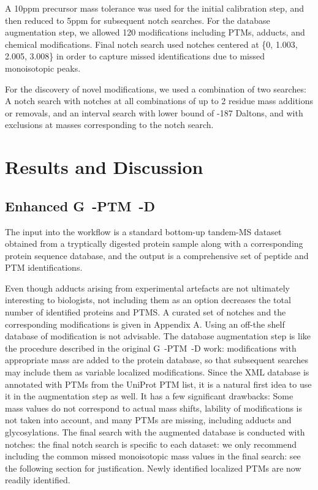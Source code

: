\documentclass[journal=jprobs,manuscript=article]{achemso}
\begin{document}
A 10ppm precursor mass tolerance was used for the initial calibration step, and then reduced to 5ppm for subsequent notch searches. For the database augmentation step, we allowed 120 modifications including PTMs, adducts, and chemical modifications. Final notch search used notches centered at \{0, 1.003, 2.005, 3.008\} in order to capture missed identifications due to missed monoisotopic peaks.

For the discovery of novel modifications, we used a combination of two searches: A notch search with notches at all combinations of up to 2 residue mass additions or removals, and an interval search with lower bound of -187 Daltons, and with exclusions at masses corresponding to the notch search.

\section{Results and Discussion}

\subsection{Enhanced G~-PTM~-D}

The input into the workflow is a standard bottom-up tandem-MS dataset obtained from a tryptically digested protein sample along with a corresponding protein sequence database, and the output is a comprehensive set of peptide and PTM identifications. 

Even though adducts arising from experimental artefacts are not ultimately interesting to biologists, not including them as an option decreases the total number of identified proteins and PTMS. A curated set of notches and the corresponding modifications is given in Appendix A. Using an off-the shelf database of modification is not advisable. The database augmentation step is like the procedure described in the original G~-PTM~-D work: modifications with appropriate mass are added to the protein database, so that subsequent searches may include them as variable localized modifications. 
Since the XML database is annotated with PTMs from the UniProt PTM list, it is a natural first idea to use it in the augmentation step as well. It has a few significant drawbacks: Some mass values do not correspond to actual mass shifts, lability of modifications is not taken into account, and many PTMs are missing, including adducts and glycosylations.
The final search with the augmented database is conducted with notches: the final notch search is specific to each dataset: we only recommend including the common missed monoisotopic mass values in the final search: see the following section for justification. Newly identified localized PTMs are now readily identified.
\end{document}
